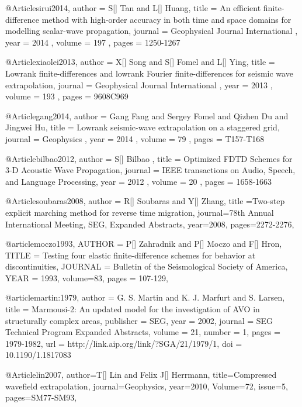 {@Article{sirui2014,
 author =  { S[] Tan and L[] Huang},
 title =   {An efficient finite-difference method with high-order accuracy in both time and space domains for modelling scalar-wave propagation},
 journal = { Geophysical Journal International },
 year =    { 2014 },
 volume =  { 197 },
 pages =   { 1250-1267 }
}

@Article{xiaolei2013,
 author =  { X[] Song and S[] Fomel and L[] Ying},
 title =   {Lowrank finite-differences and lowrank Fourier finite-differences for seismic wave extrapolation},
 journal = { Geophysical Journal International },
 year =    { 2013 },
 volume =  { 193 },
 pages =   { 960\A8C969 }
}

@Article{gang2014,
 author =  { Gang Fang and Sergey Fomel and Qizhen Du and Jingwei Hu},
 title =   {Lowrank seismic-wave extrapolation on a staggered grid},
 journal = { Geophysics },
 year =    { 2014 },
 volume =  { 79 },
 pages =   { T157-T168}
}


@Article{bilbao2012,
 author =  { S[] Bilbao },
 title =   {Optimized FDTD Schemes for 3-D Acoustic Wave Propagation},
 journal = { IEEE transactions on Audio, Speech, and Language Processing},
 year =    { 2012 },
 volume =  { 20 },
 pages =   { 1658-1663}
}

@Article{soubaras2008,
  author = {R[] Soubaras and Y[] Zhang},
  title ={Two-step explicit marching method for reverse time migration},
  journal={78th Annual International Meeting, SEG, Expanded Abstracts},
  year=2008,
  pages={2272-2276},
}

@article{moczo1993,
  AUTHOR =       {P[] Zahradnik and P[] Moczo and F[] Hron},
  TITLE =        {Testing four elastic finite-difference schemes for behavior at discontinuities},
  JOURNAL =      {Bulletin of the Seismological Society of America},
  YEAR =         {1993},
  volume=83,
  pages = {107-129},
}

@article{martin:1979,
  author =	 {G. S. Martin and K. J. Marfurt and S. Larsen},
  title =	 {Marmousi-2: An updated model for the investigation
                  of AVO in structurally complex areas},
  publisher =	 {SEG},
  year =	 2002,
  journal =	 {SEG Technical Program Expanded Abstracts},
  volume =	 21,
  number =	 1,
  pages =	 {1979-1982},
  url =		 {http://link.aip.org/link/?SGA/21/1979/1},
  doi =		 {10.1190/1.1817083}
}

@Article{lin2007,
  author={T[] Lin and Felix J[] Herrmann},
  title={Compressed wavefield extrapolation},
  journal={Geophysics},
  year=2010,
  Volume=72,
  issue=5,
  pages={SM77-SM93},
}

}
